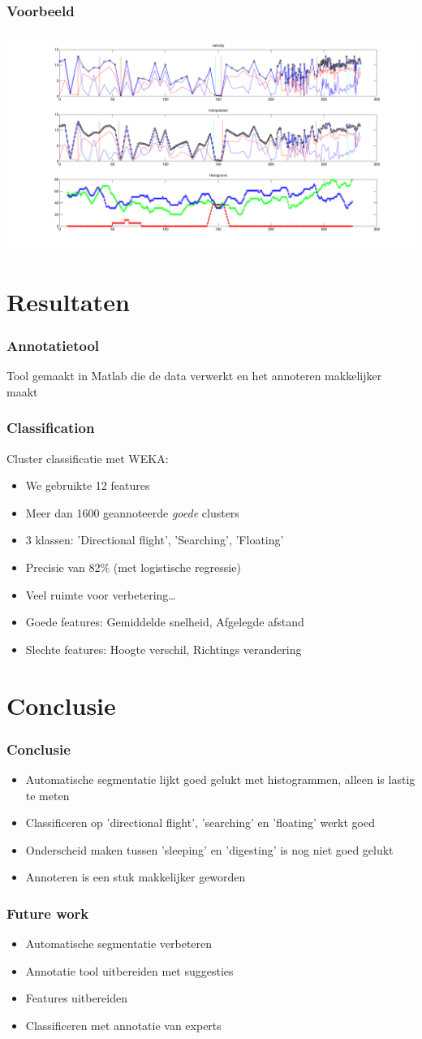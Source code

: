 \documentclass{beamer}
\newcommand{\slide}[2]
{
\begin{frame}
\frametitle{#1} 

#2

\end{frame}
}
\begin{document}
\begin{frame}
\frametitle{Voorbeeld}
\includegraphics[width=\textwidth]{clustering.pdf}
\end{frame}


\section{Resultaten}
\slide{Annotatietool}
{
	Tool gemaakt in Matlab die de data verwerkt en het annoteren makkelijker maakt
}

\slide{Classification}
{
Cluster classificatie met WEKA:
\begin{itemize}
    \item We gebruikte 12 features
    \item Meer dan 1600 geannoteerde \emph{goede} clusters
    \item 3 klassen: 'Directional flight', 'Searching', 'Floating'
    \item Precisie van 82\% (met logistische regressie)
    \item Veel ruimte voor verbetering\ldots
\end{itemize}
\vspace{1cm}
\begin{itemize}
\item Goede features: Gemiddelde snelheid, Afgelegde afstand
\item Slechte features: Hoogte verschil, Richtings verandering
\end{itemize}
}

\section{Conclusie}

\slide{Conclusie}
{
\begin{itemize}
	\item Automatische segmentatie lijkt goed gelukt met histogrammen, alleen is lastig te meten
	\item Classificeren op 'directional flight', 'searching' en 'floating' werkt goed
	\item Onderscheid maken tussen 'sleeping' en 'digesting' is nog niet goed gelukt
	\item Annoteren is een stuk makkelijker geworden
\end{itemize} 
}

\slide{Future work}
{
\begin{itemize}
	\item Automatische segmentatie verbeteren
	\item Annotatie tool uitbereiden met suggesties
	\item Features uitbereiden
	\item Classificeren met annotatie van experts
\end{itemize} 
}
\end{document}
